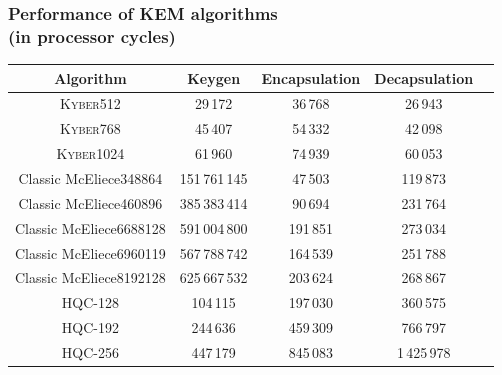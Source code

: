 \begin{frame}
    \frametitle{Performance of KEM algorithms\\(in processor cycles)}
    \begin{table}[h]
    \centering
    \begin{tabular}[p]{| c | c | c | c | c |}
        \hline
        \textbf{Algorithm} & \textbf{Keygen} & \textbf{Encapsulation} & \textbf{Decapsulation} \\ \hline
        \textsc{Kyber512} & 29\,172 & 36\,768 & 26\,943 \\
        \textsc{Kyber768} & 45\,407 & 54\,332 & 42\,098 \\
        \textsc{Kyber1024} & 61\,960 & 74\,939 & 60\,053 \\
        \hline
        Classic McEliece348864 & 151\,761\,145 & 47\,503 & 119\,873 \\
        Classic McEliece460896 & 385\,383\,414 & 90\,694 & 231\,764 \\
        Classic McEliece6688128 & 591\,004\,800 & 191\,851 & 273\,034 \\
        Classic McEliece6960119 & 567\,788\,742 & 164\,539 & 251\,788 \\
        Classic McEliece8192128 & 625\,667\,532 & 203\,624 & 268\,867 \\
        \hline
        HQC-128 & 104\,115 & 197\,030 & 360\,575 \\
        HQC-192 & 244\,636 & 459\,309 & 766\,797 \\
        HQC-256 & 447\,179 & 845\,083 & 1\,425\,978 \\
        \hline
    \end{tabular}
    \end{table}
\end{frame}


